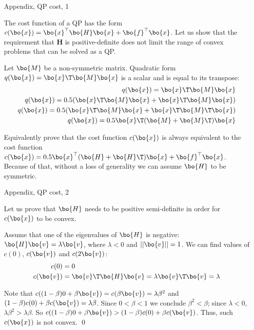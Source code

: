 \documentclass{beamer}
\begin{document}
\begin{frame}{Appendix, QP cost, 1}
	\begin{flushleft}
		
		The cost function of a QP has the form $c(\bo{x}) = \bo{x}^\top \bo{H} \bo{x} + \bo{f}^\top\bo{x}$. Let us show that the requirement that $\mathbf{H}$ is positive-definite does not limit the range of convex problems that can be solved as a QP.
		
		\bigskip
		
		Let $\bo{M}$ be a non-symmetric matrix. Quadratic form $q(\bo{x}) = \bo{x}\T \bo{M} \bo{x}$ is a scalar and is equal to its transpose:
		\begin{align}
			q(\bo{x}) = \bo{x}\T \bo{M} \bo{x} \\
			q(\bo{x}) = 0.5 (\bo{x}\T \bo{M} \bo{x} + \bo{x}\T \bo{M} \bo{x}) \\
			q(\bo{x}) = 0.5 (\bo{x}\T \bo{M} \bo{x} + \bo{x}\T \bo{M}\T \bo{x}) \\
			q(\bo{x}) = 0.5 \bo{x}\T( \bo{M} + \bo{M}\T )\bo{x}
		\end{align}
		
		Equivalently prove that the cost function $c(\bo{x})$ is always equivalent to the cost function $c(\bo{x}) = 0.5 \bo{x}^\top (\bo{H} + \bo{H}\T) \bo{x} + \bo{f}^\top\bo{x}$. Because of that, without a loss of generality we can assume $\bo{H}$ to be symmetric.
		
	\end{flushleft}
\end{frame}


\begin{frame}{Appendix, QP cost, 2}
	\begin{flushleft}
		
		Let us prove that $\bo{H}$ needs to be positive semi-definite in order for $c(\bo{x})$ to be convex.
		
		\bigskip
		
		Assume that one of the eigenvalues of $\bo{H}$ is negative: $\bo{H}\bo{v} = \lambda\bo{v}$, where $\lambda < 0$ and $||\bo{v}|| = 1$. We can find values of $c(0)$, $c(\bo{v})$ and $c(2\bo{v})$:
		\begin{align}
			c(0) &= 0 \\
			c(\bo{v}) &= \bo{v}\T \bo{H}\bo{v} =  \lambda \bo{v}\T \bo{v} =  \lambda
		\end{align}
		
		Note that $c((1 - \beta) 0 + \beta \bo{v}) = c(\beta\bo{v}) =  \lambda \beta^2$ and $(1 - \beta) c(0) + \beta c(\bo{v}) = \lambda \beta$. Since $0 < \beta < 1$ we conclude $\beta^2 < \beta$; since $\lambda < 0$, $\lambda \beta^2 > \lambda \beta$. So $c((1 - \beta) 0 + \beta \bo{v}) >  (1 - \beta) c(0) + \beta c(\bo{v})$. Thus, such $c(\bo{x})$ is not convex. \qed
		
	\end{flushleft}
\end{frame}
\end{document}
